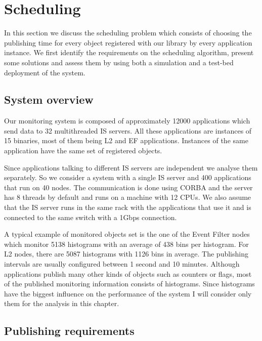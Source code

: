\chapter{Scheduling} %
\label{Capitolul4}


In this section we discuss the scheduling problem which consists of choosing the publishing time for every object registered with our library by every application instance. We first identify the requirements on the scheduling algorithm, present some solutions and assess them by using both a simulation and a test-bed deployment of the system.

\section*{System overview}

Our monitoring system is composed of approximately 12000 applications which send data to 32 multithreaded IS servers.  All these applications are instances of 15 binaries, most of them being L2 and EF applications. Instances of the same application have the same set of registered objects.

Since applications talking to different IS servers are independent we analyse them separately. So we consider a system with a single IS server and 400 applications that run on 40 nodes. The communication is done using CORBA \citep{vinoski1997corba} and the server has 8 threads by default and runs on a machine with 12 CPUs. We also assume that the IS server runs in the same rack with the applications that use it and is connected to the same switch with a 1Gbps connection.

A typical example of monitored objects set is the one of the Event Filter nodes which monitor 5138 histograms with an average of 438 bins per histogram. For L2 nodes, there are 5087 histograms with 1126 bins in average. The publishing intervals are usually configured between 1 second and 10 minutes. Although applications publish many other kinds of objects such as counters or flags, most of the published monitoring information consists of histograms. Since histograms have the biggest influence on the performance of the system I will consider only them for the analysis in this chapter.

\section*{Publishing requirements}

